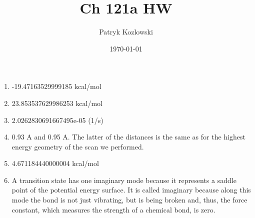 \documentclass[12pt]{article}
\title{Ch 121a HW}
\author{Patryk Kozlowski}
\date{\today}
\begin{document}
\maketitle
\begin{enumerate}
    \item -19.47163529999185 kcal/mol
    \item 23.853537629986253 kcal/mol
    \item 2.0262830691667495e-05 (1/s)
    \item 0.93 A and 0.95 A. The latter of the distances  is the same as for the highest energy geometry of the scan we performed.
    \item 4.671184440000004 kcal/mol
    \item A transition state has one imaginary mode because it represents a saddle point of the potential energy surface. It is called imaginary because along this mode the bond is not just vibrating, but is being broken and, thus, the force constant, which measures the strength of a chemical bond, is zero.
\end{enumerate}
\end{document}
